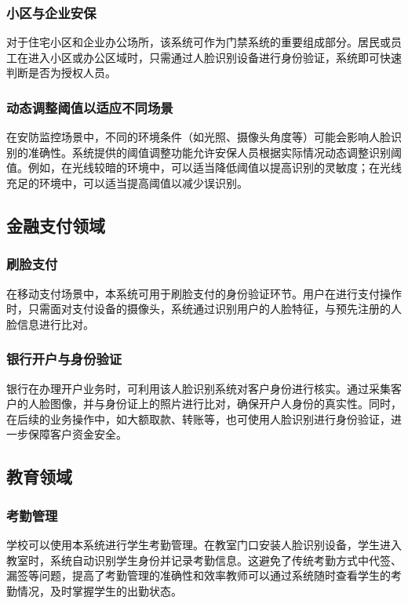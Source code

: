 \documentclass{article}
\begin{document}
\subsubsection{小区与企业安保}
对于住宅小区和企业办公场所，该系统可作为门禁系统的重要组成部分。居民或员工在进入小区或办公区域时，只需通过人脸识别设备进行身份验证，系统即可快速判断是否为授权人员。

\subsubsection{动态调整阈值以适应不同场景}
在安防监控场景中，不同的环境条件（如光照、摄像头角度等）可能会影响人脸识别的准确性。系统提供的阈值调整功能允许安保人员根据实际情况动态调整识别阈值。例如，在光线较暗的环境中，可以适当降低阈值以提高识别的灵敏度；在光线充足的环境中，可以适当提高阈值以减少误识别。

\subsection{金融支付领域}

\subsubsection{刷脸支付}
在移动支付场景中，本系统可用于刷脸支付的身份验证环节。用户在进行支付操作时，只需面对支付设备的摄像头，系统通过识别用户的人脸特征，与预先注册的人脸信息进行比对。

\subsubsection{银行开户与身份验证}
银行在办理开户业务时，可利用该人脸识别系统对客户身份进行核实。通过采集客户的人脸图像，并与身份证上的照片进行比对，确保开户人身份的真实性。同时，在后续的业务操作中，如大额取款、转账等，也可使用人脸识别进行身份验证，进一步保障客户资金安全。

\subsection{教育领域}

\subsubsection{考勤管理}
学校可以使用本系统进行学生考勤管理。在教室门口安装人脸识别设备，学生进入教室时，系统自动识别学生身份并记录考勤信息。这避免了传统考勤方式中代签、漏签等问题，提高了考勤管理的准确性和效率教师可以通过系统随时查看学生的考勤情况，及时掌握学生的出勤状态。
\end{document}
